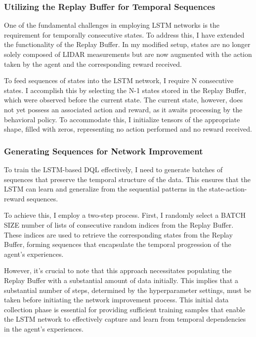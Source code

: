 \documentclass{scrartcl}
\begin{document}
\subsubsection{Utilizing the Replay Buffer for Temporal Sequences} 

One of the fundamental challenges in employing LSTM networks is the requirement for temporally consecutive states. To address this, 
I have extended the functionality of the Replay Buffer. In my modified setup, states are no longer solely composed of LIDAR 
measurements but are now augmented with the action taken by the agent and the corresponding reward received.

To feed sequences of states into the LSTM network, I require N consecutive states. I accomplish this by selecting the N-1 states 
stored in the Replay Buffer, which were observed before the current state. The current state, however, does not yet possess an 
associated action and reward, as it awaits processing by the behavioral policy. To accommodate this, I initialize tensors of the 
appropriate shape, filled with zeros, representing no action performed and no reward received.

\subsubsection{Generating Sequences for Network Improvement}

To train the LSTM-based DQL effectively, I need to generate batches of sequences that preserve the temporal structure of the data. This ensures that the LSTM can learn and generalize from the sequential patterns in the state-action-reward sequences.

To achieve this, I employ a two-step process. First, I randomly select a BATCH SIZE number of lists of consecutive random indices from the Replay Buffer. These indices are used to retrieve the corresponding states from the Replay Buffer, forming sequences that encapsulate the temporal progression of the agent's experiences.

However, it's crucial to note that this approach necessitates populating the Replay Buffer with a substantial amount of data initially. This implies that a substantial number of steps, determined by the hyperparameter settings, must be taken before initiating the network improvement process. This initial data collection phase is essential for providing sufficient training samples that enable the LSTM network to effectively capture and learn from temporal dependencies in the agent's experiences.
\end{document}
